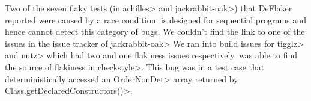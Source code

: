 Two of the seven flaky tests (in \<achilles> and \<jackrabbit-oak>) that DeFlaker reported were caused by a race condition. \TheDeterminismChecker
is designed for sequential programs and hence cannot detect this category of bugs.  
We couldn't find the link to one of the issues in the issue tracker of \<jackrabbit-oak>
We ran into build issues
for \<tigglz> and \<nutz> which had two and one flakiness issues respectively. 
\TheDeterminismChecker was able to find the source of flakiness in \<checkstyle>. This bug was in a test
case that deterministically accessed an \<OrderNonDet> array returned by \<Class.getDeclaredConstructors()>.

